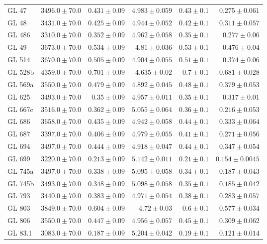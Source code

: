 \begin{longtable*}{lrrrrr}
GL 47 & $3496.0\pm 70.0$ & $0.431\pm 0.09$ & $4.983\pm 0.059$ & $0.43\pm 0.1$ & $0.275\pm 0.061$ \\ 
GL 48 & $3431.0\pm 70.0$ & $0.425\pm 0.09$ & $4.944\pm 0.052$ & $0.42\pm 0.1$ & $0.311\pm 0.057$ \\ 
GL 486 & $3310.0\pm 70.0$ & $0.352\pm 0.09$ & $4.962\pm 0.058$ & $0.35\pm 0.1$ & $0.277\pm 0.06$ \\ 
GL 49 & $3673.0\pm 70.0$ & $0.534\pm 0.09$ & $4.81\pm 0.036$ & $0.53\pm 0.1$ & $0.476\pm 0.04$ \\ 
GL 514 & $3670.0\pm 70.0$ & $0.505\pm 0.09$ & $4.904\pm 0.055$ & $0.51\pm 0.1$ & $0.374\pm 0.06$ \\ 
GL 528b & $4359.0\pm 70.0$ & $0.701\pm 0.09$ & $4.635\pm 0.02$ & $0.7\pm 0.1$ & $0.681\pm 0.028$ \\ 
GL 569a & $3550.0\pm 70.0$ & $0.479\pm 0.09$ & $4.892\pm 0.045$ & $0.48\pm 0.1$ & $0.379\pm 0.053$ \\ 
GL 625 & $3493.0\pm 70.0$ & $0.35\pm 0.09$ & $4.957\pm 0.011$ & $0.35\pm 0.1$ & $0.317\pm 0.01$ \\ 
GL 667c & $3516.0\pm 70.0$ & $0.362\pm 0.09$ & $5.055\pm 0.064$ & $0.36\pm 0.1$ & $0.216\pm 0.053$ \\ 
GL 686 & $3658.0\pm 70.0$ & $0.435\pm 0.09$ & $4.942\pm 0.058$ & $0.44\pm 0.1$ & $0.333\pm 0.064$ \\ 
GL 687 & $3397.0\pm 70.0$ & $0.406\pm 0.09$ & $4.979\pm 0.055$ & $0.41\pm 0.1$ & $0.271\pm 0.056$ \\ 
GL 694 & $3497.0\pm 70.0$ & $0.444\pm 0.09$ & $4.918\pm 0.047$ & $0.44\pm 0.1$ & $0.347\pm 0.054$ \\ 
GL 699 & $3220.0\pm 70.0$ & $0.213\pm 0.09$ & $5.142\pm 0.011$ & $0.21\pm 0.1$ & $0.154\pm 0.0045$ \\ 
GL 745a & $3497.0\pm 70.0$ & $0.338\pm 0.09$ & $5.095\pm 0.058$ & $0.34\pm 0.1$ & $0.187\pm 0.043$ \\ 
GL 745b & $3493.0\pm 70.0$ & $0.348\pm 0.09$ & $5.098\pm 0.058$ & $0.35\pm 0.1$ & $0.185\pm 0.042$ \\ 
GL 793 & $3440.0\pm 70.0$ & $0.383\pm 0.09$ & $4.971\pm 0.054$ & $0.38\pm 0.1$ & $0.283\pm 0.057$ \\ 
GL 803 & $3849.0\pm 70.0$ & $0.604\pm 0.09$ & $4.72\pm 0.03$ & $0.6\pm 0.1$ & $0.577\pm 0.034$ \\ 
GL 806 & $3550.0\pm 70.0$ & $0.447\pm 0.09$ & $4.956\pm 0.057$ & $0.45\pm 0.1$ & $0.309\pm 0.062$ \\ 
GL 83.1 & $3083.0\pm 70.0$ & $0.187\pm 0.09$ & $5.204\pm 0.042$ & $0.19\pm 0.1$ & $0.121\pm 0.014$ \\ 

\end{longtable*}
